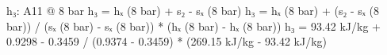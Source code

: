 h₃:  
A11 @ 8 bar  
h₃ = hₓ (8 bar) + s₂ - sₓ (8 bar)  
h₃ = hₓ (8 bar) + (s₂ - sₓ (8 bar)) / (sₓ (8 bar) - sₓ (8 bar)) * (hₓ (8 bar) - hₓ (8 bar))  
h₃ = 93.42 kJ/kg + 0.9298 - 0.3459 / (0.9374 - 0.3459) * (269.15 kJ/kg - 93.42 kJ/kg)